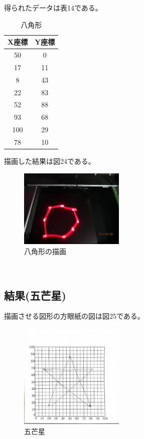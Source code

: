 \documentclass{jarticle}
\begin{document}
得られたデータは表14である。
\begin{table}[H]
    \centering
    \caption{八角形}
    \begin{tabular}{c|c}
       X座標&Y座標 \\
    \hline\hline
    50 &0　\\
    17 &11\\
    8&43\\
    22&83\\
    52&88\\
    93&68\\
    100&29\\
    78&10\\
    \end{tabular}
    
    \label{tab:my_label}
\end{table}
描画した結果は図24である。
\begin{figure}[H]
    \centering
    
    \includegraphics[width=5cm]{IMG_2194.JPG}
    \caption{八角形の描画}
    \label{fig:my_label}
\end{figure}\\
\subsection{結果(五芒星)}

描画させる図形の方眼紙の図は図25である。
\begin{figure}[H]
    \centering
    
    \includegraphics[width=5cm]{8_star.pdf}
    \caption{五芒星}
    \label{fig:my_label}
\end{figure}
\end{document}

